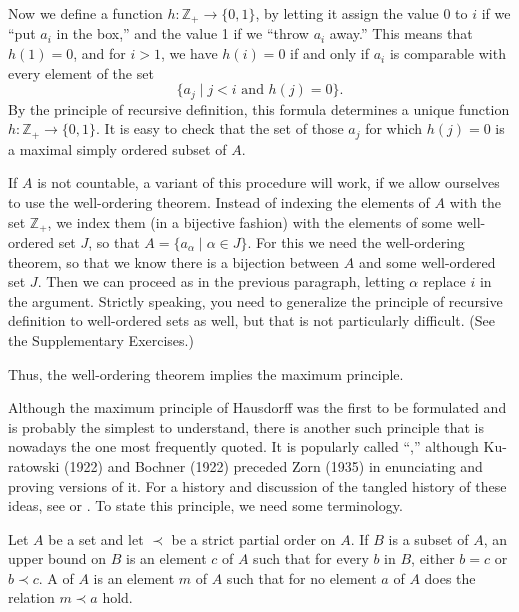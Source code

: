 Now we define a function \(h : \mathbb{Z}_{+} \rightarrow \{ 0,1\}\), 
by letting it assign the value 0 to \(i\) if we ``put \(a_{i}\) in the box,'' 
and the value 1 if we ``throw \(a_{i}\) away.'' This means that \(h(1) = 0\), 
and for \(i > 1\), we have \(h(i) = 0\) if and only if \(a_{i}\) is comparable 
with every element of the set
\[
\{ {a_{j} \mid j < i\text{ and }h( j) = 0}\} \text{.}
\]
By the principle of recursive definition, this formula determines 
a unique function \(h : \mathbb{Z}_{+} \rightarrow \{ 0,1\}\). 
It is easy to check that the set of those \(a_{j}\) for which \(h( j) = 0\) 
is a maximal simply ordered subset of \(A\).

If \(A\) is not countable, a variant of this procedure will work, 
if we allow ourselves to use the well-ordering theorem. 
Instead of indexing the elements of \(A\) with the set \(\mathbb{Z}_{+}\), 
we index them (in a bijective fashion) with the elements of some well-ordered set \(J\), 
so that \(A = \{ {a_{\alpha } \mid \alpha \in J}\}\). 
For this we need the well-ordering theorem, so that we know there is a bijection 
between \(A\) and some well-ordered set \(J\). Then we can proceed as in 
the previous paragraph, letting \(\alpha\) replace \(i\) in the argument. 
Strictly speaking, you need to generalize the principle of recursive definition 
to well-ordered sets as well, but that is not particularly difficult. 
(See the Supplementary Exercises.)

Thus, the well-ordering theorem implies the maximum principle.

Although the maximum principle of Hausdorff was the first to be formulated and 
is probably the simplest to understand, there is another such principle that is 
nowadays the one most frequently quoted. It is popularly called ``,'' 
although Ku-ratowski (1922) and Bochner (1922) preceded Zorn (1935) in enunciating 
and proving versions of it. For a history and discussion of the tangled history of 
these ideas, see \cite{Campbell1978} or \cite{Moore1982}. To state this principle, 
we need some terminology.

\begin{definition}
 Let \(A\) be a set and let \(\prec\) be a strict partial order on \(A\). If \(B\) is a subset of \(A\), an upper bound on \(B\) is an element \(c\) of \(A\) such that for every \(b\) in \(B\), either \(b = c\) or \(b \prec c\). A  of \(A\) is an element \(m\) of \(A\) such that for no element \(a\) of \(A\) does the relation \(m \prec a\) hold.
\end{definition}

